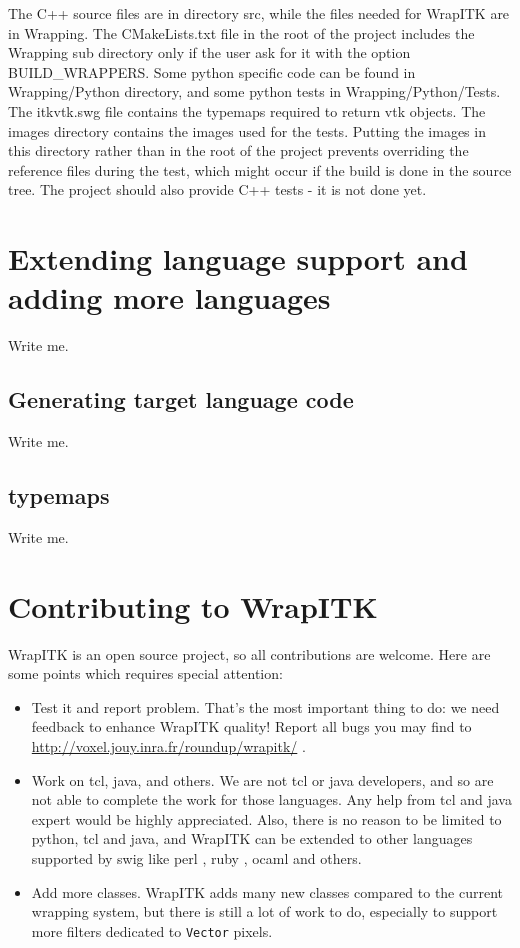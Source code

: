 \documentclass{InsightArticle}
\begin{document}
The C++ source files are in
directory src, while the files needed for WrapITK are in Wrapping.
The CMakeLists.txt file in the root of the project includes the
Wrapping sub directory only if the user ask for it with the option
BUILD\_WRAPPERS. Some python specific code can be found in Wrapping/Python
directory, and some python tests in Wrapping/Python/Tests.
The itkvtk.swg file contains the typemaps required to return vtk
objects.
The images directory contains the images used for the tests. Putting
the images in this directory rather than in the root of the project
prevents overriding the reference files during the test, which might occur if the build
is done in the source tree.
The project should also provide C++ tests - it is not done yet.


  \section{Extending language support and adding more languages}

Write me.

    \subsection{Generating target language code}

Write me.

    \subsection{typemaps}

Write me.

  \section{Contributing to WrapITK}
\label{section:contribute}

WrapITK is an open source project, so all contributions are welcome. Here are
some points which requires special attention:
\begin{itemize}
  \item Test it and report problem. That's the most important thing to do:
we need feedback to enhance WrapITK quality! Report all bugs you may find
to \url{http://voxel.jouy.inra.fr/roundup/wrapitk/} \cite{RoundupWebSite}.
  \item Work on tcl, java, and others. We are not tcl or java developers, and so
are not able to complete the work for those languages. Any help from tcl and
java expert would be highly appreciated. Also, there is no reason to be limited
to python, tcl and java, and WrapITK can be extended to other languages supported
by swig like perl \cite{PerlWebSite}, ruby \cite{RubyWebSite}, ocaml \cite{OcamlWebSite} and others.
  \item Add more classes. WrapITK adds many new classes compared to the current
wrapping system, but there is still a lot of work to do, especially to support more
filters dedicated to \verb$Vector$ pixels.
\end{itemize}
\end{document}
